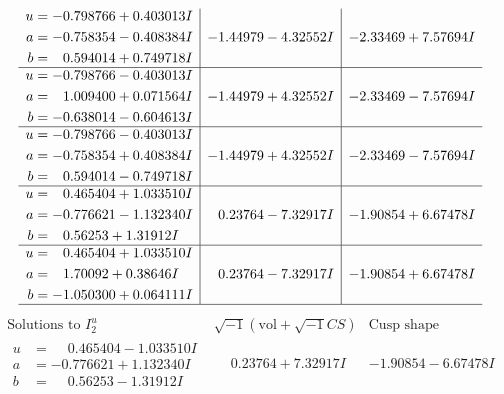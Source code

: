 \documentclass[1p]{elsarticle_modified}
\theoremstyle{definition}
\newcommand{\I}{\sqrt{-1}}
\begin{document}
$$\begin{array}{c|c|c}
\begin{aligned}
u &= -0.798766 + 0.403013 I \\
a &= -0.758354 - 0.408384 I \\
b &= \phantom{-}0.594014 + 0.749718 I\end{aligned}
 & -1.44979 - 4.32552 I & -2.33469 + 7.57694 I \\ \hline\begin{aligned}
u &= -0.798766 - 0.403013 I \\
a &= \phantom{-}1.009400 + 0.071564 I \\
b &= -0.638014 - 0.604613 I\end{aligned}
 & -1.44979 + 4.32552 I & -2.33469 - 7.57694 I \\ \hline\begin{aligned}
u &= -0.798766 - 0.403013 I \\
a &= -0.758354 + 0.408384 I \\
b &= \phantom{-}0.594014 - 0.749718 I\end{aligned}
 & -1.44979 + 4.32552 I & -2.33469 - 7.57694 I \\ \hline\begin{aligned}
u &= \phantom{-}0.465404 + 1.033510 I \\
a &= -0.776621 - 1.132340 I \\
b &= \phantom{-}0.56253 + 1.31912 I\end{aligned}
 & \phantom{-}0.23764 - 7.32917 I & -1.90854 + 6.67478 I \\ \hline\begin{aligned}
u &= \phantom{-}0.465404 + 1.033510 I \\
a &= \phantom{-}1.70092 + 0.38646 I \\
b &= -1.050300 + 0.064111 I\end{aligned}
 & \phantom{-}0.23764 - 7.32917 I & -1.90854 + 6.67478 I\\
 \hline 
 \end{array}$$\newpage$$\begin{array}{c|c|c}  
\text{Solutions to }I^u_{2}& \I (\text{vol} + \sqrt{-1}CS) & \text{Cusp shape}\\
 \hline 
\begin{aligned}
u &= \phantom{-}0.465404 - 1.033510 I \\
a &= -0.776621 + 1.132340 I \\
b &= \phantom{-}0.56253 - 1.31912 I\end{aligned}
 & \phantom{-}0.23764 + 7.32917 I & -1.90854 - 6.67478 I \\ \hline\begin{aligned}

\end{aligned}
\end{array}$$
\end{document}
